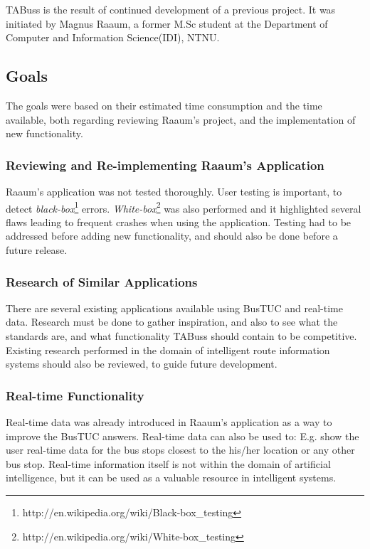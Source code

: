 TABuss is the result of continued development of a previous project\cite{mag}. It was initiated by Magnus Raaum, a former M.Sc student at the Department of Computer and Information Science(IDI), NTNU. 


\newpage
\subsection{Goals}
The goals were based on their estimated time consumption and the time available, both regarding reviewing Raaum's project, and the implementation of new functionality. 

\subsubsection{Reviewing and Re-implementing Raaum's Application}
Raaum's application\cite{mag} was not tested thoroughly. User testing is important, to detect \emph{black-box}\footnote{http://en.wikipedia.org/wiki/Black-box\_testing} errors. \emph{White-box}\footnote{http://en.wikipedia.org/wiki/White-box\_testing} was also performed and it highlighted several flaws leading to frequent crashes when using the application. Testing had to be addressed before adding new functionality, and should also be done before a future release.


\subsubsection{Research of Similar Applications}
There are several existing applications available using BusTUC and real-time data. Research must be done to gather inspiration, and also to see what the standards are, and what functionality TABuss should contain to be competitive. Existing research performed in the domain of intelligent route information systems should also be reviewed, to guide future development.

\subsubsection{Real-time Functionality}
Real-time data was already introduced in Raaum's application as a way to improve the BusTUC answers. Real-time data can also be used to: E.g. show the user real-time data for the bus stops closest to the his/her location or any other bus stop. Real-time information itself is not within the domain of artificial intelligence, but it can be used as a valuable resource in intelligent systems.

